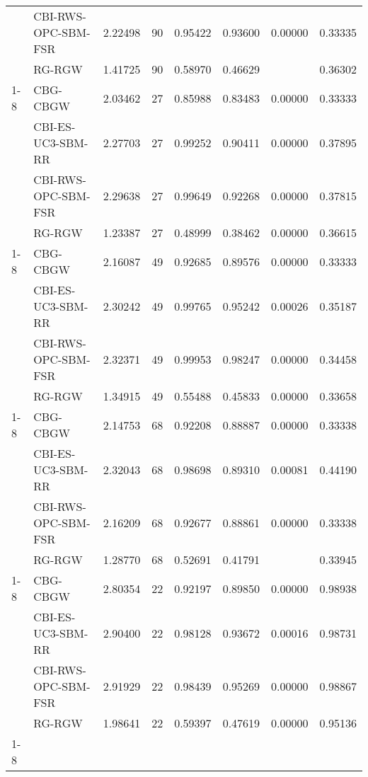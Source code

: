 \begin{tabular}{llrrrrrr}
 & CBI-RWS-OPC-SBM-FSR & 2.22498 & 90 & 0.95422 & 0.93600 & 0.00000 & 0.33335 \\
 & RG-RGW & 1.41725 & 90 & 0.58970 & 0.46629 &  & 0.36302 \\
\cline{1-8}
\multirow[t]{4}{*}{OutcomeSepsisReader25} & CBG-CBGW & 2.03462 & 27 & 0.85988 & 0.83483 & 0.00000 & 0.33333 \\
 & CBI-ES-UC3-SBM-RR & 2.27703 & 27 & 0.99252 & 0.90411 & 0.00000 & 0.37895 \\
 & CBI-RWS-OPC-SBM-FSR & 2.29638 & 27 & 0.99649 & 0.92268 & 0.00000 & 0.37815 \\
 & RG-RGW & 1.23387 & 27 & 0.48999 & 0.38462 & 0.00000 & 0.36615 \\
\cline{1-8}
\multirow[t]{4}{*}{OutcomeSepsisReader50} & CBG-CBGW & 2.16087 & 49 & 0.92685 & 0.89576 & 0.00000 & 0.33333 \\
 & CBI-ES-UC3-SBM-RR & 2.30242 & 49 & 0.99765 & 0.95242 & 0.00026 & 0.35187 \\
 & CBI-RWS-OPC-SBM-FSR & 2.32371 & 49 & 0.99953 & 0.98247 & 0.00000 & 0.34458 \\
 & RG-RGW & 1.34915 & 49 & 0.55488 & 0.45833 & 0.00000 & 0.33658 \\
\cline{1-8}
\multirow[t]{4}{*}{OutcomeSepsisReader75} & CBG-CBGW & 2.14753 & 68 & 0.92208 & 0.88887 & 0.00000 & 0.33338 \\
 & CBI-ES-UC3-SBM-RR & 2.32043 & 68 & 0.98698 & 0.89310 & 0.00081 & 0.44190 \\
 & CBI-RWS-OPC-SBM-FSR & 2.16209 & 68 & 0.92677 & 0.88861 & 0.00000 & 0.33338 \\
 & RG-RGW & 1.28770 & 68 & 0.52691 & 0.41791 &  & 0.33945 \\
\cline{1-8}
\multirow[t]{4}{*}{OutcomeTrafficFineReader} & CBG-CBGW & 2.80354 & 22 & 0.92197 & 0.89850 & 0.00000 & 0.98938 \\
 & CBI-ES-UC3-SBM-RR & 2.90400 & 22 & 0.98128 & 0.93672 & 0.00016 & 0.98731 \\
 & CBI-RWS-OPC-SBM-FSR & 2.91929 & 22 & 0.98439 & 0.95269 & 0.00000 & 0.98867 \\
 & RG-RGW & 1.98641 & 22 & 0.59397 & 0.47619 & 0.00000 & 0.95136 \\
\cline{1-8}
\bottomrule
\end{tabular}
